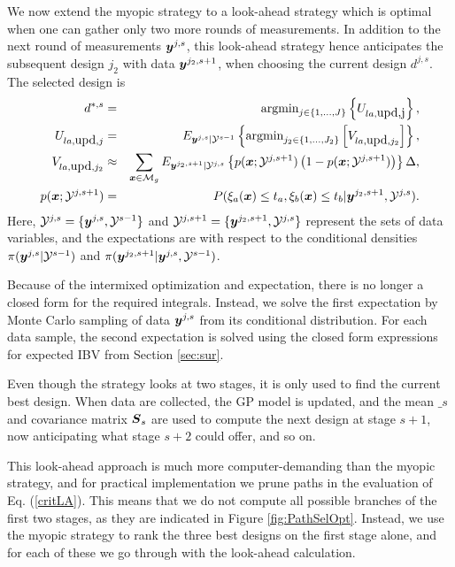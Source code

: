 \documentclass[aoas]{imsart}
\begin{document}
We now extend the myopic strategy to a look-ahead strategy which is optimal when one can gather only two more rounds of measurements. In addition to the next round of measurements ${\boldsymbol y}^{j,s}$, this look-ahead strategy hence anticipates the subsequent design $j_2$ with data ${\boldsymbol y}^{j_2,s+1}$, when choosing the current design $d^{j,s}$. 
The selected design is
\begin{eqnarray}\label{critLA}
    d^{*,s} &=& \mbox{argmin}_{j \in \{1,\ldots,J\}} \left\{ U_{la,\mbox{upd,j}} \right\},  \\
    U_{la,\mbox{upd},j} & = &  E_{\by^{j,s}|\mathcal{Y}^{s-1}} \left\{ \mbox{argmin}_{j_2 \in \{1,\ldots,{J}_2\}} \left[ V_{la,\mbox{upd},j_2} \right] \right\}, \nonumber \\
V_{la,\mbox{upd},j_2} & \approx & \sum_{\bx \in \mathcal{M}_g} E_{\by^{j_2,s+1}|\mathcal{Y}^{j,s}} \left\{ p(\bx;\mathcal{Y}^{j,s+1})\left( 1-p(\bx;\mathcal{Y}^{j,s+1})\right) \right\} \Delta, \nonumber \\
    p(\bx;\mathcal{Y}^{j,s+1}) &=& P(\xi_a(\bx) \leq t_a, \xi_b(\bx) \leq t_b |\by^{j_2,s+1},\mathcal{Y}^{j,s}). \nonumber
\end{eqnarray}
Here, $\mathcal{Y}^{j,s}=\{{\boldsymbol y}^{j,s},\mathcal{Y}^{s-1}\}$ and $\mathcal{Y}^{j,s+1}=\{{\boldsymbol y}^{j_2,s+1},\mathcal{Y}^{j,s}\}$ represent the sets of data variables, and the expectations are with respect to the conditional densities $\pi({\boldsymbol y}^{j,s}|\mathcal{Y}^{s-1})$ and $\pi({\boldsymbol y}^{j_2,s+1}|{\boldsymbol y}^{j,s},\mathcal{Y}^{s-1})$. 

Because of the intermixed optimization and expectation, there is no longer a closed form for the required integrals. Instead, we solve the first expectation by Monte Carlo sampling of data ${\boldsymbol y}^{j,s}$ from its conditional distribution. For each data sample, the second expectation is solved using the closed form expressions for expected IBV from Section \ref{sec:sur}. 

Even though the strategy looks at two stages, it is only used to find the current best design. When data are collected, the GP model is updated, and the mean $\bm_{s}$ and covariance matrix ${\boldsymbol S}_{s}$ are used to compute the next design at stage $s+1$, now anticipating what stage $s+2$ could offer, and so on. 

This look-ahead approach is much more computer-demanding than the myopic strategy, and for practical implementation we prune paths in the evaluation of Eq. (\ref{critLA}). This means that we do not compute all possible branches of the first two stages, as they are indicated in Figure \ref{fig:PathSelOpt}. Instead, we use the myopic strategy to rank the three best designs on the first stage alone, and for each of these we go through with the look-ahead calculation. 
\end{document}
